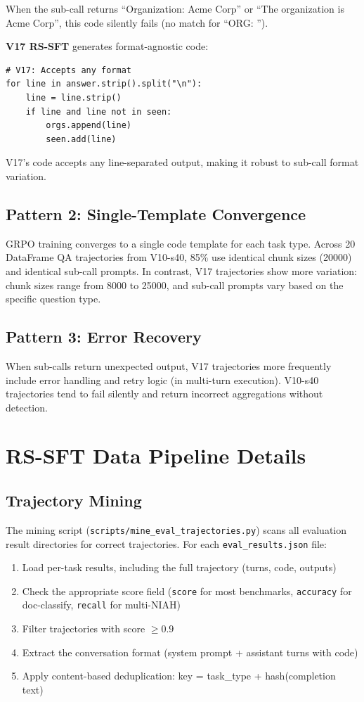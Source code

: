\documentclass{article}
\begin{document}
When the sub-call returns ``Organization: Acme Corp'' or ``The organization is Acme Corp'', this code silently fails (no match for ``ORG: '').

\textbf{V17 RS-SFT} generates format-agnostic code:
{\footnotesize
\begin{verbatim}
# V17: Accepts any format
for line in answer.strip().split("\n"):
    line = line.strip()
    if line and line not in seen:
        orgs.append(line)
        seen.add(line)
\end{verbatim}
}

V17's code accepts any line-separated output, making it robust to sub-call format variation.

\subsection{Pattern 2: Single-Template Convergence}

GRPO training converges to a single code template for each task type. Across 20 DataFrame QA trajectories from V10-s40, 85\% use identical chunk sizes (20000) and identical sub-call prompts. In contrast, V17 trajectories show more variation: chunk sizes range from 8000 to 25000, and sub-call prompts vary based on the specific question type.

\subsection{Pattern 3: Error Recovery}

When sub-calls return unexpected output, V17 trajectories more frequently include error handling and retry logic (in multi-turn execution). V10-s40 trajectories tend to fail silently and return incorrect aggregations without detection.

\section{RS-SFT Data Pipeline Details}
\label{app:data-pipeline}

\subsection{Trajectory Mining}

The mining script (\texttt{scripts/mine\_eval\_trajectories.py}) scans all evaluation result directories for correct trajectories. For each \texttt{eval\_results.json} file:

\begin{enumerate}
    \item Load per-task results, including the full trajectory (turns, code, outputs)
    \item Check the appropriate score field (\texttt{score} for most benchmarks, \texttt{accuracy} for doc-classify, \texttt{recall} for multi-NIAH)
    \item Filter trajectories with score $\geq 0.9$
    \item Extract the conversation format (system prompt + assistant turns with code)
    \item Apply content-based deduplication: key = task\_type + hash(completion text)
\end{enumerate}
\end{document}
